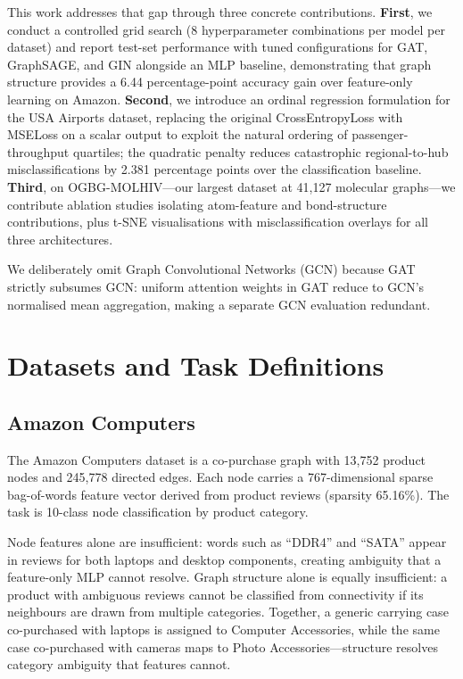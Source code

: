 \documentclass[conference]{IEEEtran}
\begin{document}
This work addresses that gap through three concrete contributions. \textbf{First}, we conduct a controlled grid search (8 hyperparameter combinations per model per dataset) and report test-set performance with tuned configurations for GAT, GraphSAGE, and GIN alongside an MLP baseline, demonstrating that graph structure provides a 6.44 percentage-point accuracy gain over feature-only learning on Amazon. \textbf{Second}, we introduce an ordinal regression formulation for the USA Airports dataset, replacing the original CrossEntropyLoss with MSELoss on a scalar output to exploit the natural ordering of passenger-throughput quartiles; the quadratic penalty reduces catastrophic regional-to-hub misclassifications by 2.381 percentage points over the classification baseline. \textbf{Third}, on OGBG-MOLHIV---our largest dataset at 41,127 molecular graphs---we contribute ablation studies isolating atom-feature and bond-structure contributions, plus t-SNE visualisations with misclassification overlays for all three architectures.

We deliberately omit Graph Convolutional Networks (GCN) \cite{kipf2017} because GAT \cite{velickovic2018} strictly subsumes GCN: uniform attention weights in GAT reduce to GCN's normalised mean aggregation, making a separate GCN evaluation redundant.

\section{Datasets and Task Definitions}

\subsection{Amazon Computers}

The Amazon Computers dataset \cite{shchur2018} is a co-purchase graph with 13,752 product nodes and 245,778 directed edges. Each node carries a 767-dimensional sparse bag-of-words feature vector derived from product reviews (sparsity 65.16\%). The task is 10-class node classification by product category.

Node features alone are insufficient: words such as ``DDR4'' and ``SATA'' appear in reviews for both laptops and desktop components, creating ambiguity that a feature-only MLP cannot resolve. Graph structure alone is equally insufficient: a product with ambiguous reviews cannot be classified from connectivity if its neighbours are drawn from multiple categories. Together, a generic carrying case co-purchased with laptops is assigned to Computer Accessories, while the same case co-purchased with cameras maps to Photo Accessories---structure resolves category ambiguity that features cannot.
\end{document}

